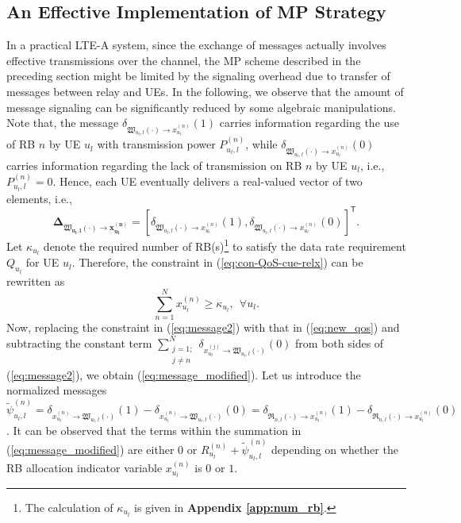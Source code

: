 \documentclass[twocolumn,10pt]{IEEEtran}
\begin{document}
\subsection{An Effective Implementation of MP Strategy}

In a practical LTE-A system, since the exchange of messages actually involves effective transmissions over the channel, the MP scheme described in the preceding section might be limited by the signaling overhead  due to transfer of messages between relay and UEs. In the following, we observe that the amount of message signaling can be significantly reduced by some algebraic manipulations. Note that, the message $\delta_{\mathfrak{W}_{u_l, l}(\cdot)  \rightarrow x_{u_l}^{(n)}} \left( 1\right)$ carries information regarding the use of RB $n$ by UE $u_l$ with transmission power $P_{u_l,l}^{(n)}$, while $\delta_{\mathfrak{W}_{u_l, l}(\cdot)  \rightarrow x_{u_l}^{(n)}} \left( 0 \right)$ carries information regarding the lack of transmission on RB $n$ by UE $u_l$, i.e., $P_{u_l,l}^{(n)} = 0$. Hence, each UE eventually delivers a real-valued vector of two elements, i.e., $$\boldsymbol{ \Delta_{\mathfrak{W}_{u_l, l}(\cdot)  \rightarrow x_{u_l}^{(n)}} } = \left[ \delta_{\mathfrak{W}_{u_l, l}(\cdot)  \rightarrow x_{u_l}^{(n)}} \left( 1\right), \delta_{\mathfrak{W}_{u_l, l}(\cdot)  \rightarrow x_{u_l}^{(n)}} \left( 0\right)  \right]^\mathsf{T}.$$ Let $\kappa_{u_l}$ denote the required number of RB(s)\footnote{The calculation of $\kappa_{u_l}$ is given in \textbf{Appendix \ref{app:num_rb}}.} to satisfy the data rate requirement $Q_{u_l}$ for UE $u_l$. Therefore, the constraint in (\ref{eq:con-QoS-cue-relx}) can be rewritten as 
\begin{equation} \label{eq:new_qos}
\sum_{n =1}^N    x_{u_l}^{(n)}   \geq  \kappa_{u_l}, ~~ \forall u_l.     
\end{equation}
Now, replacing the constraint in (\ref{eq:message2}) with that in (\ref{eq:new_qos}) and subtracting the constant term $\displaystyle \sum_{\substack{j =1; \\ j \neq n}}^N \delta_{x_{u_l}^{(j)} \rightarrow \mathfrak{W}_{u_l, l}(\cdot)   } \left(0 \right) $ from both sides of (\ref{eq:message2}), we obtain (\ref{eq:message_modified}). Let us introduce the normalized messages $\tilde{\psi}_{u_l, l}^{(n)} = \delta_{x_{u_l}^{(n)} \rightarrow \mathfrak{W}_{u_l, l}(\cdot)   } \left( 1 \right) - \delta_{x_{u_l}^{(n)} \rightarrow \mathfrak{W}_{u_l, l}(\cdot)   } \left(0 \right) = \delta_{\mathfrak{R}_{n,l}(\cdot) \rightarrow x_{u_l}^{(n)}} \left( 1 \right) - \delta_{\mathfrak{R}_{n,l}(\cdot) \rightarrow x_{u_l}^{(n)}} \left( 0 \right)$. It can be observed that the terms within the summation in (\ref{eq:message_modified}) are either $0$ or $R_{u_l}^{(n)} + \tilde{\psi}_{u_l, l}^{(n)}$ depending on whether the RB allocation indicator variable $x_{u_l}^{(n)}$ is $0$ or $1$. 
\end{document}
